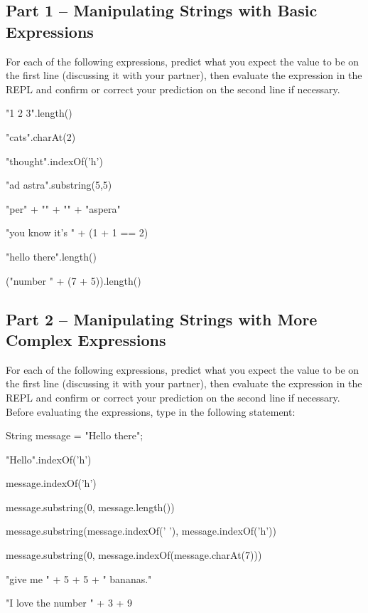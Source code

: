 \subsection{Part 1 -- Manipulating Strings with Basic Expressions}

\begin{eval}
For each of the following expressions, predict what you expect the value to be on the first line (discussing it with your partner), then evaluate the expression in the REPL and confirm or correct your prediction on the second line if necessary. 
\begin{sevalenum}
\item "1 2 3".length()
\evallinetwo
\item "cats".charAt(2)
\evallinetwo
\item "thought".indexOf('h')
\evallinetwo
\item "ad astra".substring(5,5)
\evallinetwo
\item "per" + "" + "" + "aspera"
\evallinetwo
\item "you know it's " + (1 + 1 == 2)
\evallinetwo
\item "hello   there".length()
\evallinetwo
\item ("number " + (7 + 5)).length()
\evallinetwo
\end{sevalenum}
\end{eval}



\initialbox

\subsection{Part 2 -- Manipulating Strings with More Complex Expressions}

\begin{eval}
For each of the following expressions, predict what you expect the value to be on the first line (discussing it with your partner), then evaluate the expression in the REPL and confirm or correct your prediction on the second line if necessary. Before evaluating the expressions, type in the following statement:

\begin{code}
String message = "Hello there";
\end{code}

\begin{sevalenum}
\item "Hello".indexOf('h')
\evallinetwo
\item message.indexOf('h')
\evallinetwo
\item message.substring(0, message.length())
\evallinetwo
\item message.substring(message.indexOf(' '), message.indexOf('h'))
\evallinetwo
\item message.substring(0, message.indexOf(message.charAt(7)))
\evallinetwo
\item "give me " + 5 + 5 + " bananas."
\evallinetwo
\item "I love the number " + 3 + 9
\evallinetwo
\end{sevalenum}
\end{eval}

